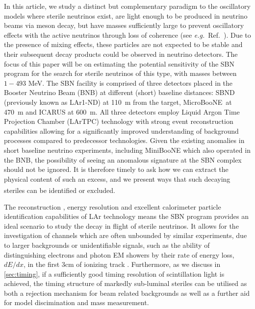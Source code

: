 \documentclass[11pt, a4paper]{article}
\newcommand{\refref}[1]{Ref.~\cite{#1}}
\def\eg{\emph{e.g.}}
\def\muboone{MicroBooNE}
\newcounter{CommentCount}
\newcommand{\marcom}[2]{\textsuperscript{\textcolor{#1}{\theCommentCount}}\marginpar{\textsuperscript{\textcolor{#1}{\theCommentCount}}\textcolor{#1}{{\small#1: #2}}}\stepcounter{CommentCount}}
\begin{document}
In this article, we study a distinct but complementary paradigm to the
oscillatory models where sterile neutrinos exist, are light enough to be
produced in neutrino beams via meson decay, but have masses sufficiently large
to prevent oscillatory effects with the active neutrinos through loss of
coherence (see \eg\ \refref{Akhmedov:2009rb}). Due to the presence of mixing
effects, these particles are not expected to be stable and their subsequent
decay products could be observed in neutrino detectors.
%
%
The focus of this paper will be on estimating the potential sensitivity of the
SBN program for the search for sterile neutrinos of this type, with masses
between $1-493$ MeV.
%
The SBN facility is comprised of three detectors placed in the Booster Neutrino
Beam (BNB) at different (short) baseline distances: SBND (previously known as
LAr1-ND) at 110~m from the target, \muboone\ at 470~m and ICARUS at 600~m.  All
three detectors employ Liquid Argon Time Projection Chamber (LArTPC) technology
\cite{Rubbia:1977} with strong event reconstruction capabilities allowing for a
significantly improved understanding of background processes compared to
predecessor technologies. 
%
%
Given the existing anomalies in short baseline neutrino experiments, including
MiniBooNE which also operated in the BNB, the possibility of seeing an
anomalous signature at the SBN complex should not be ignored. It is therefore
timely to ask how we can extract the physical content of such an excess, and we
present ways that such decaying steriles can be identified or excluded.
\marcom{PB}{Delete the last 2 sentences?}

The reconstruction \cite{Church:2013hea, Marshall:2015rfa}, energy resolution
\cite{Sorel:2014rka} and excellent calorimeter particle identification
capabilities of LAr \cite{Antonello:2012hu} technology means the SBN program
provides an ideal scenario to study the decay in flight of sterile neutrinos.
It allows for the investigation of channels which are often unbounded by
similar experiments, due to larger backgrounds or unidentifiable signals, such
as the ability of distinguishing electrons and photon EM showers by their rate
of energy loss, $dE/dx$, in the first 3cm of ionizing track \cite{szelc:2007}.
Furthermore, as we discuss in \ref{sec:timing}, if a sufficiently good timing
resolution of scintillation light is achieved, the timing structure of markedly
sub-luminal steriles can be utilised as both a rejection mechanism for beam
related backgrounds as well as a further aid for model discimination and mass
measurement.
\end{document}
